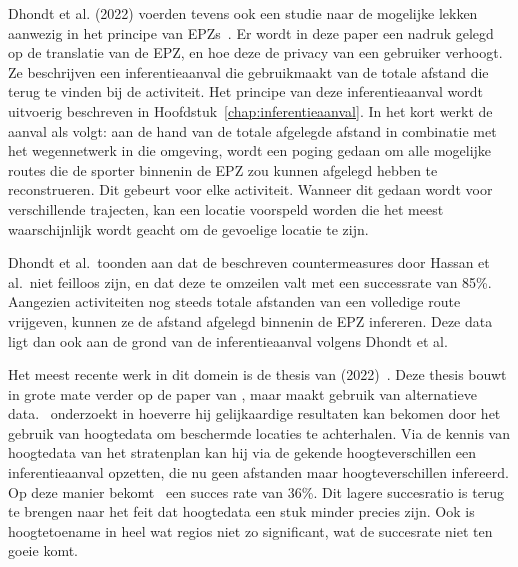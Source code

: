 Dhondt et al. (2022) voerden tevens ook een studie naar de mogelijke lekken
aanwezig in het principe van \acp{EPZ}~\cite{Dhondt}. Er wordt in deze paper
een nadruk gelegd op de translatie van de \ac{EPZ}, en hoe deze de privacy van
een gebruiker verhoogt. Ze beschrijven een inferentieaanval die gebruikmaakt
van de totale afstand die terug te vinden bij de activiteit. Het principe van
deze inferentieaanval wordt uitvoerig beschreven in
Hoofdstuk~\ref{chap:inferentieaanval}. In het kort werkt de aanval als volgt:
aan de hand van de totale afgelegde afstand in combinatie met het wegennetwerk
in die omgeving, wordt een poging gedaan om alle mogelijke routes die de
sporter binnenin de \ac{EPZ} zou kunnen afgelegd hebben te reconstrueren. Dit
gebeurt voor elke activiteit. Wanneer dit gedaan wordt voor verschillende
trajecten, kan een locatie voorspeld worden die het meest waarschijnlijk wordt
geacht om de gevoelige locatie te zijn.

Dhondt et al.\ toonden aan dat de beschreven countermeasures door Hassan et
al.\ niet feilloos zijn, en dat deze te omzeilen valt met een successrate van
85\%. Aangezien activiteiten nog steeds totale afstanden van een volledige
route vrijgeven, kunnen ze de afstand afgelegd binnenin de EPZ infereren. Deze
data ligt dan ook aan de grond van de inferentieaanval volgens Dhondt et al.

Het meest recente werk in dit domein is de thesis van
\citeauthor{Verdonck_2022} (2022)~\cite{Verdonck_2022}. Deze thesis bouwt in
grote mate verder op de paper van \citeauthor{Dhondt}, maar maakt gebruik van
alternatieve data.\ \citeauthor{Verdonck_2022} onderzoekt in hoeverre hij
gelijkaardige resultaten kan bekomen door het gebruik van hoogtedata om
beschermde locaties te achterhalen. Via de kennis van hoogtedata van het
stratenplan kan hij via de gekende hoogteverschillen een inferentieaanval
opzetten, die nu geen afstanden maar hoogteverschillen infereerd. Op deze
manier bekomt~\citeauthor{Verdonck_2022} een succes rate van 36\%. Dit lagere
succesratio is terug te brengen naar het feit dat hoogtedata een stuk minder
precies zijn. Ook is hoogtetoename in heel wat regios niet zo significant, wat
de succesrate niet ten goeie komt.